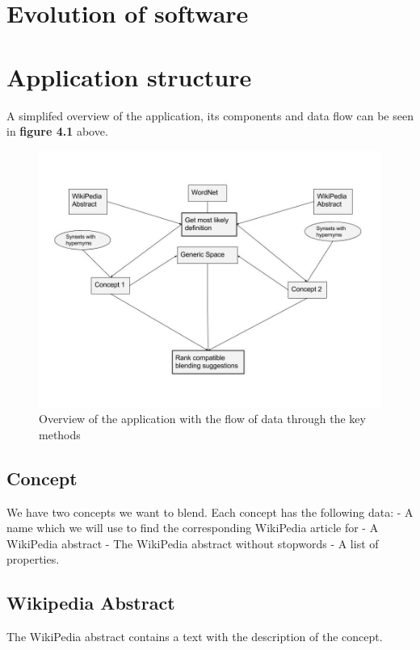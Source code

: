 
\section{Evolution of software}


\section{Application structure}
A simplifed overview of the application, its components and data flow can be seen in \textbf{figure 4.1} above.

\begin{figure}
\centering
\includegraphics[width=1\linewidth]{"Figures/Application structure"}
\caption{Overview of the application with the flow of data through the key methods}
\label{fig:application-structure}
\end{figure}

\subsection{Concept}
We have two concepts we want to blend. Each concept has the following data:
- A name which we will use to find the corresponding WikiPedia article for
- A WikiPedia abstract
- The WikiPedia abstract without stopwords
- A list of properties.

\subsection{Wikipedia Abstract}
The WikiPedia abstract contains a text with the description of the concept.

